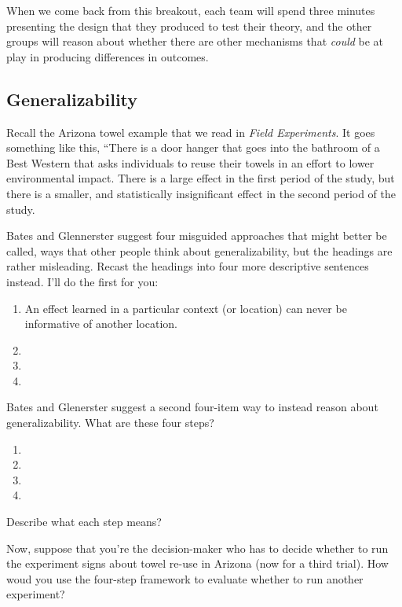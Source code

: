 \documentclass[
]{article}
\providecommand{\tightlist}{%
  \setlength{\itemsep}{0pt}\setlength{\parskip}{0pt}}
\begin{document}
When we come back from this breakout, each team will spend three minutes presenting the design that they produced to test their theory, and the other groups will reason about whether there are other mechanisms that \emph{could} be at play in producing differences in outcomes.

\hypertarget{generalizability}{%
\subsection{Generalizability}\label{generalizability}}

Recall the Arizona towel example that we read in \emph{Field Experiments}. It goes something like this, ``There is a door hanger that goes into the bathroom of a Best Western that asks individuals to reuse their towels in an effort to lower environmental impact. There is a large effect in the first period of the study, but there is a smaller, and statistically insignificant effect in the second period of the study.

Bates and Glennerster suggest four misguided approaches that might better be called, ways that other people think about generalizability, but the headings are rather misleading. Recast the headings into four more descriptive sentences instead. I'll do the first for you:

\begin{enumerate}
\def\labelenumi{\arabic{enumi}.}
\tightlist
\item
  An effect learned in a particular context (or location) can never be informative of another location.
\item
\item
\item
\end{enumerate}

Bates and Glenerster suggest a second four-item way to instead reason about generalizability. What are these four steps?

\begin{enumerate}
\def\labelenumi{\arabic{enumi}.}
\tightlist
\item
\item
\item
\item
\end{enumerate}

Describe what each step means?

Now, suppose that you're the decision-maker who has to decide whether to run the experiment signs about towel re-use in Arizona (now for a third trial). How woud you use the four-step framework to evaluate whether to run another experiment?
\end{document}
